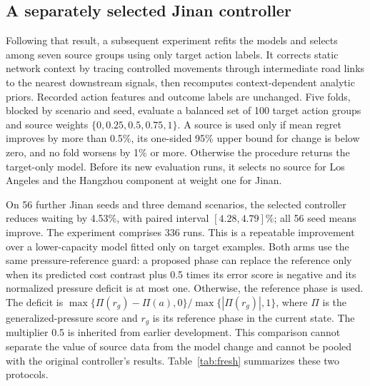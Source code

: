 \subsection{A separately selected Jinan controller}
Following that result, a subsequent experiment refits the models and selects among seven source groups using only target action labels. It corrects static network context by tracing controlled movements through intermediate road links to the nearest downstream signals, then recomputes context-dependent analytic priors. Recorded action features and outcome labels are unchanged. Five folds, blocked by scenario and seed, evaluate a balanced set of 100 target action groups and source weights $\{0,0.25,0.5,0.75,1\}$. A source is used only if mean regret improves by more than 0.5\%, its one-sided 95\% upper bound for change is below zero, and no fold worsens by 1\% or more. Otherwise the procedure returns the target-only model. Before its new evaluation runs, it selects no source for Los Angeles and the Hangzhou component at weight one for Jinan.

On 56 further Jinan seeds and three demand scenarios, the selected controller reduces waiting by 4.53\%, with paired interval $[4.28,4.79]\%$; all 56 seed means improve. The experiment comprises 336 runs. This is a repeatable improvement over a lower-capacity model fitted only on target examples. Both arms use the same pressure-reference guard: a proposed phase can replace the reference only when its predicted cost contrast plus 0.5 times its error score is negative and its normalized pressure deficit is at most one. Otherwise, the reference phase is used. The deficit is $\max\{\Pi(r_g)-\Pi(a),0\}/\max\{|\Pi(r_g)|,1\}$, where $\Pi$ is the generalized-pressure score and $r_g$ is its reference phase in the current state. The multiplier 0.5 is inherited from earlier development. This comparison cannot separate the value of source data from the model change and cannot be pooled with the original controller's results. Table~\ref{tab:fresh} summarizes these two protocols.

